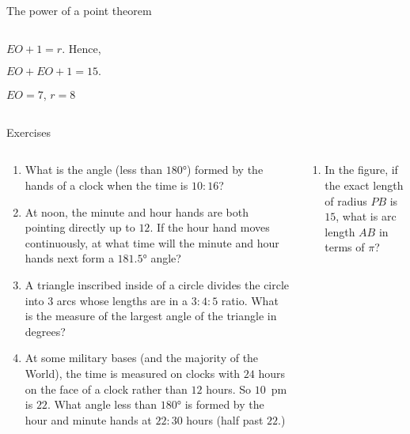 \documentclass[9pt,aspectratio=169]{beamer}
\begin{document}
\begin{frame}{The power of a point theorem}
\begin{columns}[T]
\begin{column}{0.5\textwidth}
\begin{minipage}[t]{0.5\textwidth}
        $EO + 1 = r$. 
        Hence, 

        $EO + EO + 1 = 15.$

        $EO = 7$,
        $r = 8$
      \end{minipage}      
    \end{column}
  \end{columns}
\end{frame}

\begin{frame}{Exercises}
  \begin{columns}[T]
    \begin{column}{0.5\textwidth}
      \begin{enumerate}
        \item What is the angle (less than $180°$) formed by the hands of a clock when the time is $10{:}16$?

        \item At noon, the minute and hour hands are both pointing directly up to $12$.  If the hour hand moves continuously, at what time will the minute and hour hands next form a $181.5°$ angle?

        \item A triangle inscribed inside of a circle divides the circle into $3$ arcs whose lengths are in a $3{:}4{:}5$ ratio.  What is the measure of the largest angle of the triangle in degrees?

        \item At some military bases (and the majority of the World), the time is measured on clocks with $24$ hours on the face of a clock rather than $12$ hours.  So $10$~pm is $22$.  What angle less than $180°$ is formed by the hour and minute hands at $22{:}30$ hours (half past $22$.)
        \seti
      \end{enumerate}
    \end{column}
    \begin{column}{0.5\textwidth}
      \begin{columns}[T, totalwidth=\textwidth]
        \begin{column}{0.6\linewidth}
          \setlength{\leftmargini}{0.2cm}
          \begin{enumerate}
            \conti
            \item In the figure, if the exact length of radius $PB$ is $15$, what is arc length $AB$ in terms of $\pi$?\vspace*{2\baselineskip}
    

\end{enumerate}
\end{column}
\end{columns}
\end{column}
\end{columns}
\end{frame}
\end{document}
